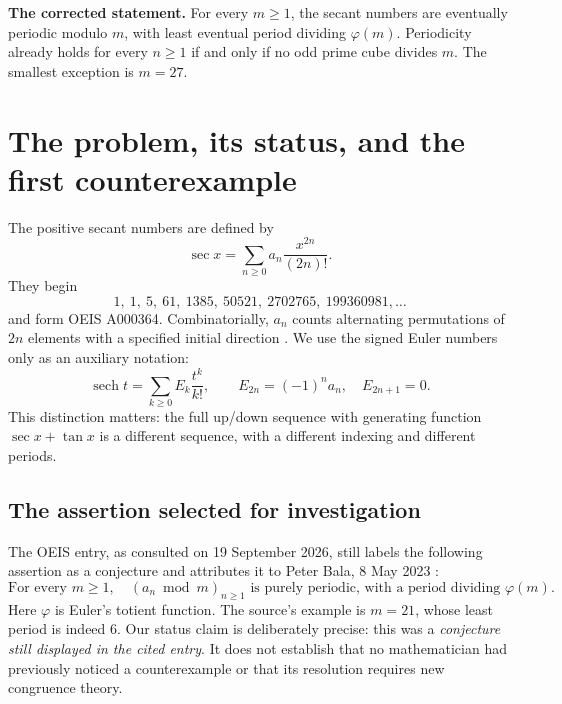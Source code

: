 \documentclass[11pt,a4paper]{article}
\numberwithin{equation}{section}
\theoremstyle{definition}
\DeclareMathOperator{\sech}{sech}
\begin{document}
\begin{resultbox}
\noindent\textbf{The corrected statement.} For every $m\ge1$, the secant
numbers are eventually periodic modulo $m$, with least eventual period
dividing $\varphi(m)$. Periodicity already holds for every $n\ge1$ if and
only if no odd prime cube divides $m$. The smallest exception is $m=27$.
\end{resultbox}

\clearpage
\begingroup
\small
\setlength{\parskip}{0pt}
\tableofcontents
\endgroup
\clearpage

\section{The problem, its status, and the first counterexample}
\label{sec:problem}

The positive secant numbers are defined by
\begin{equation}\label{eq:egf}
\sec x=\sum_{n\ge0}a_n\frac{x^{2n}}{(2n)!}.
\end{equation}
They begin
\[
1,\ 1,\ 5,\ 61,\ 1385,\ 50521,\ 2702765,\ 199360981,\ldots
\]
and form OEIS A000364. Combinatorially, $a_n$ counts alternating
permutations of $2n$ elements with a specified initial direction
\cite{oeis}. We use the signed Euler numbers only as an auxiliary notation:
\begin{equation}\label{eq:signed}
\sech t=\sum_{k\ge0}E_k\frac{t^k}{k!},\qquad
E_{2n}=(-1)^n a_n,\quad E_{2n+1}=0.
\end{equation}
This distinction matters: the full up/down sequence with generating
function $\sec x+\tan x$ is a different sequence, with a different indexing
and different periods.

\subsection{The assertion selected for investigation}

The OEIS entry, as consulted on 19 September 2026, still labels the following
assertion as a conjecture and attributes it to Peter Bala, 8 May 2023
\cite{oeis}:
\begin{equation}\label{eq:conjecture}
\text{For every }m\ge1,\quad (a_n\bmod m)_{n\ge1}
\text{ is purely periodic, with a period dividing }\varphi(m).
\end{equation}
Here $\varphi$ is Euler's totient function. The source's example is $m=21$,
whose least period is indeed $6$. Our status claim is deliberately precise:
this was a \emph{conjecture still displayed in the cited entry}. It does not
establish that no mathematician had previously noticed a counterexample or
that its resolution requires new congruence theory.
\end{document}
